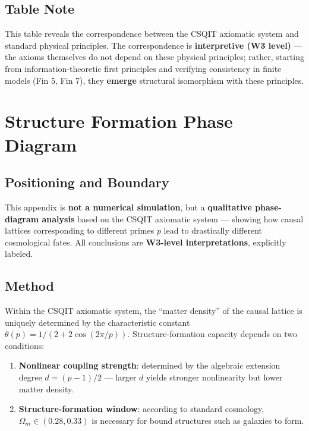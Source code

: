 \documentclass[aps,prd,twocolumn,nofootinbib,floatfix]{revtex4-2}
\begin{document}
\subsection{Table Note}

This table reveals the correspondence between the CSQIT axiomatic system and standard physical principles. The correspondence is \textbf{interpretive (W3 level)} --- the axioms themselves do not depend on these physical principles; rather, starting from information-theoretic first principles and verifying consistency in finite models (Fin 5, Fin 7), they \textbf{emerge} structural isomorphism with these principles.

\section{Structure Formation Phase Diagram}

\subsection{Positioning and Boundary}

This appendix is \textbf{not a numerical simulation}, but a \textbf{qualitative phase-diagram analysis} based on the CSQIT axiomatic system --- showing how causal lattices corresponding to different primes $p$ lead to drastically different cosmological fates. All conclusions are \textbf{W3-level interpretations}, explicitly labeled.

\subsection{Method}

Within the CSQIT axiomatic system, the ``matter density'' of the causal lattice is uniquely determined by the characteristic constant $\theta(p) = 1/(2+2\cos(2\pi/p))$. Structure-formation capacity depends on two conditions:

\begin{enumerate}
    \item \textbf{Nonlinear coupling strength}: determined by the algebraic extension degree $d=(p-1)/2$ --- larger $d$ yields stronger nonlinearity but lower matter density.
    \item \textbf{Structure-formation window}: according to standard cosmology, $\Omega_m \in (0.28, 0.33)$ is necessary for bound structures such as galaxies to form.
\end{enumerate}
\end{document}
